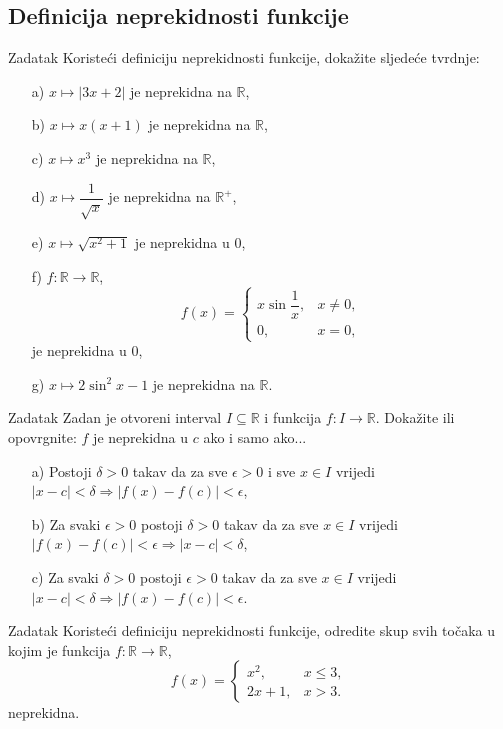 \subsection*{Definicija neprekidnosti funkcije}
\begin{exercise}{Zadatak}
Koristeći definiciju neprekidnosti funkcije, dokažite sljedeće tvrdnje: 
\begin{itemize}
\item[a)] \(x\mapsto |3x+2|\) je neprekidna na \(\mathbb{R}\),
\item[b)] \(x\mapsto x(x+1)\) je neprekidna na \(\mathbb{R}\),
\item[c)] \(x\mapsto x^3\) je neprekidna na \(\mathbb{R}\),
\item[d)] \(x\mapsto \dfrac{1}{\sqrt{x}}\) je neprekidna na \(\mathbb{R}^+\),
\item[e)] \(x\mapsto \sqrt{x^2+1}\) je neprekidna u \(0\),
\item[f)] \(f : \mathbb{R}\to \mathbb{R}\), \[f(x)=\begin{cases}
x\sin{\dfrac{1}{x}}, & x\neq 0,\\
0, & x=0,
\end{cases}
\] 
je neprekidna u \(0\),
\item[g)] \(x\mapsto 2\sin^2{x}-1\) je neprekidna na \(\mathbb{R}\).
\end{itemize}
\end{exercise}
\begin{exercise}{Zadatak}
Zadan je otvoreni interval \(I\subseteq \mathbb{R}\) i funkcija \(f : I\to \mathbb{R}\). Dokažite ili opovrgnite: \(f\) je neprekidna u \(c\) ako i samo ako...
\begin{itemize}
\item[a)] Postoji \(\delta>0\) takav da za sve \(\epsilon>0\) i sve \(x\in I\) vrijedi \(|x-c|<\delta\Rightarrow |f(x)-f(c)|<\epsilon\),
\item[b)] Za svaki \(\epsilon>0\) postoji \(\delta>0\) takav da za sve \(x\in I\) vrijedi \(|f(x)-f(c)|<\epsilon\Rightarrow |x-c|<\delta\),
\item[c)] Za svaki \(\delta>0\) postoji \(\epsilon>0\) takav da za sve \(x\in I\) vrijedi \(|x-c|<\delta\Rightarrow |f(x)-f(c)|<\epsilon\).
\end{itemize}
\end{exercise}
\begin{exercise}{Zadatak}
Koristeći definiciju neprekidnosti funkcije, odredite skup svih točaka u kojim je funkcija \(f : \mathbb{R}\to \mathbb{R}\),
\[f(x)=\begin{cases}
x^2,& x\leq 3,\\
2x+1,& x>3.
\end{cases}\]
neprekidna.
\end{exercise}
